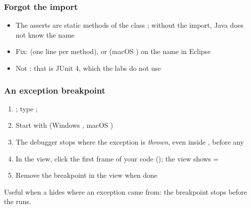 \documentclass[aspectratio=169,10pt,compress]{beamer}
\begin{document}
\begin{frame}[t,fragile] \frametitle{Forgot the import}

	\begin{itemize}\small
		\item The asserts are static methods of the class ; without the import, Java does not know the name
		\item Fix:  (one line per method),
			  or  (macOS ) on the name in Eclipse
		\item Not : that is JUnit 4, which the labs do not use
	\end{itemize}
\end{frame}








\begin{frame}[t,fragile] \frametitle{An exception breakpoint}
	\begin{enumerate}\small
		\item {}; type ; 
		\item Start with  (Windows , macOS )
		\item The debugger stops where the exception is \emph{thrown}, even inside , before any 
		\item In the  view, click the first frame of your code (); the 
			  view shows  = 
		\item Remove the breakpoint in the  view when done
	\end{enumerate}

	\vspace{0.5em}
	\small Useful when a  hides where an exception came from: the breakpoint stops before the  runs.
\end{frame}
\end{document}
